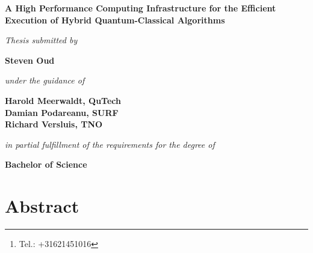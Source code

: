\documentclass[a4paper,11pt]{report}
\title{\thesistitle}
\author{\authorname\thanks{Tel.: +31621451016}\\
    500776959\\
    \\
    \emph{Faculty of Computer Science, Information Technology,}\\
    \emph{Business IT and Management}\\
    Software Engineering
    \\
    \\
    \\
    Advisor: Marten Teitsma
    \\
    \\
    \\
    Amsterdam University of Applied Sciences\\
    \today}
\date{}
\renewcommand{\thefootnote}{\fnsymbol{footnote}}
\newcommand{\thesistitle}{A High Performance Computing Infrastructure for the Efficient Execution of Hybrid Quantum-Classical Algorithms}
\newcommand{\authorname}{Steven Oud}
\begin{document}
\begin{titlepage}
\thispagestyle{empty}
    \begin{center}
        \vspace*{1cm}
        \textbf{\LARGE \thesistitle}
        
        \vspace{1.5cm}
        \textit{\large Thesis submitted by}

        \vspace{0.75cm}
        
        \textbf{\large \authorname}
        
        \vspace{0.75cm}
        \textit{\large under the guidance of}
        
        \vspace{0.75cm}
        \textbf{\large Harold Meerwaldt, QuTech\\
            Damian Podareanu, SURF\\
            Richard Versluis, TNO}
        
        \vspace{0.75cm}
        \textit{\large in partial fulfillment of the requirements for the degree of}
        
        \vspace{0.75cm}
        \textbf{\large Bachelor of Science}
        
    \end{center}
\end{titlepage}

\maketitle

\renewcommand{\thefootnote}{\arabic{footnote}}

\chapter*{Abstract}
\lipsum[5]

\cleardoublepage
\tableofcontents

\cleardoublepage
\listoffigures

\cleardoublepage
\listoftables

\cleardoublepage
{}







\cleardoublepage
\printbibliography[heading=bibintoc]

\cleardoublepage
\printnoidxglossaries
\end{document}
